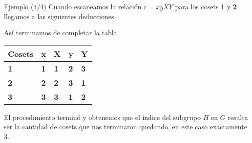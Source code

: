 \documentclass[aspectratio=169, 9pt]{beamer}
\begin{document}
\begin{frame}[fragile]{Ejemplo (4/4)}
	Cuando escaneamos la relación $r=xyXY$ para los cosets \textbf{1} y \textbf{2} 
	llegamos a las siguientes deducciones 
	\pause
	\begin{center}
	\end{center}

\pause
	Así terminamos de completar la tabla.
	
	\begin{table}[]
		\begin{tabular}{|l|l|l|l|l|}
			\hline
			Cosets     & x          & X          & y          & Y          \\ \hline
			\textbf{1} & \textbf{1} & \textbf{1} & \textbf{2} & \textbf{3} \\ \hline
			\textbf{2} & \color{verde}\textbf{2} & \color{verde}\textbf{2} & \textbf{3} & \textbf{1} \\ \hline
			\textbf{3} & \color{verde}\textbf{3} & \color{verde}\textbf{3} & \textbf{1} & \textbf{2} \\ \hline
		\end{tabular}
	\end{table}
	\pause
	El procedimiento terminó y obtenemos que el índice del subgrupo $H$ en $G$ resulta ser la cantidad de cosets que nos terminaron quedando, en este caso exactamente $3$.
\end{frame}
\end{document}
